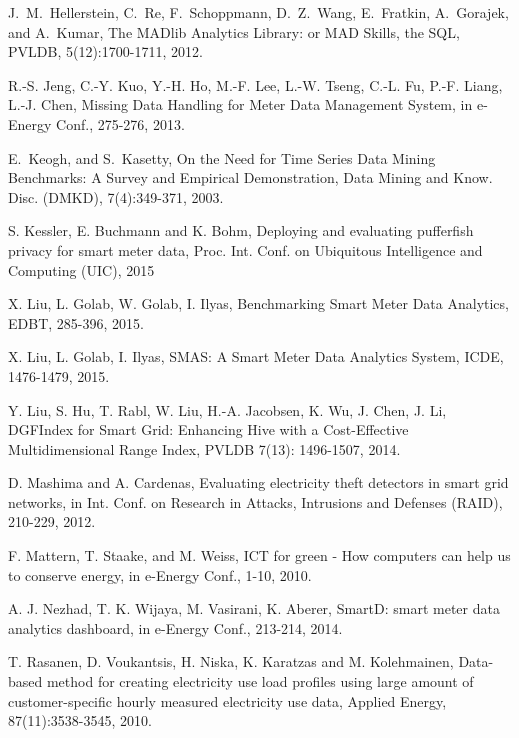 \documentclass[prodmode,acmtods]{acmsmall}
\begin{document}
\begin{thebibliography}{12}
 J.~M.~Hellerstein, C.~Re, F.~Schoppmann, D.~Z.~Wang, E.~Fratkin, A.~Gorajek, and A.~Kumar, The MADlib Analytics Library: or MAD Skills, the SQL, PVLDB, 5(12):1700-1711, 2012.

R.-S. Jeng, C.-Y. Kuo, Y.-H. Ho, M.-F. Lee, L.-W. Tseng, C.-L. Fu, P.-F. Liang, L.-J. Chen,
Missing Data Handling for Meter Data Management System,
in e-Energy Conf., 275-276, 2013.

E.~Keogh, and S.~Kasetty, On the Need for Time Series Data Mining Benchmarks: A Survey and Empirical Demonstration, Data Mining and Know. Disc. (DMKD), 7(4):349-371, 2003.

S. Kessler, E. Buchmann and K. Bohm, Deploying and evaluating pufferfish privacy for smart meter data, Proc. Int. Conf. on Ubiquitous Intelligence and Computing (UIC), 2015

X. Liu, L. Golab, W. Golab, I. Ilyas, Benchmarking Smart Meter Data Analytics, EDBT, 285-396, 2015.

X. Liu, L. Golab, I. Ilyas, SMAS: A Smart Meter Data Analytics System, ICDE, 1476-1479, 2015.

Y. Liu, S. Hu, T. Rabl, W. Liu, H.-A. Jacobsen, K. Wu, J. Chen, J. Li, DGFIndex for Smart Grid: Enhancing Hive with a Cost-Effective Multidimensional Range Index, PVLDB 7(13): 1496-1507, 2014.

D. Mashima and A. Cardenas, Evaluating electricity theft detectors in smart grid networks, in Int. Conf. on Research in Attacks, Intrusions and Defenses (RAID), 210-229, 2012.

F. Mattern, T. Staake, and M. Weiss, ICT for green - How computers can help us to conserve energy,  in e-Energy Conf., 1-10, 2010.

A. J. Nezhad, T. K. Wijaya, M. Vasirani, K. Aberer, SmartD: smart meter data analytics dashboard, in e-Energy Conf., 213-214, 2014.

T. Rasanen, D. Voukantsis, H. Niska, K. Karatzas and
M. Kolehmainen, Data-based method for creating electricity use load profiles using large amount of customer-specific hourly measured electricity use data, Applied Energy, 87(11):3538-3545, 2010.


\end{thebibliography}
\end{document}

